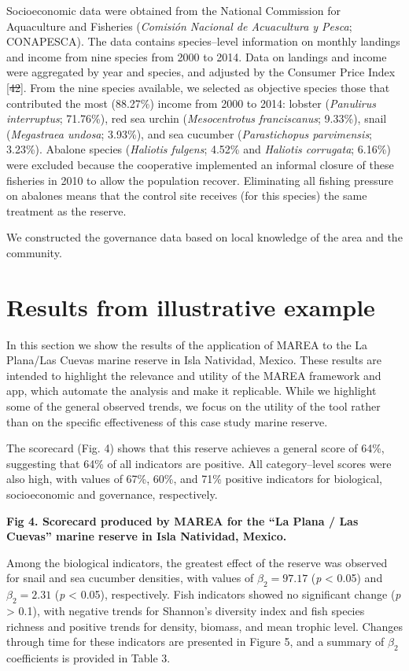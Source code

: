 \documentclass[12pt,]{article}
\providecommand{\DIFaddtex}[1]{{\protect\color{blue}\uwave{#1}}} %
\providecommand{\DIFdeltex}[1]{{\protect\color{red}\sout{#1}}}                      %
\providecommand{\DIFaddbegin}{} %
\providecommand{\DIFaddend}{} %
\providecommand{\DIFdelbegin}{} %
\providecommand{\DIFdelend}{} %
\providecommand{\DIFadd}[1]{\texorpdfstring{\DIFaddtex{#1}}{#1}} %
\providecommand{\DIFdel}[1]{\texorpdfstring{\DIFdeltex{#1}}{}} %
\newcommand{\DIFscaledelfig}{0.5}
\newlength{\DIFdelgraphicswidth} %
\newlength{\DIFdelgraphicsheight} %
\newcommand{\DIFaddincludegraphics}[2][]{{\color{blue}\fbox{\DIFOincludegraphics[#1]{#2}}}} %
\newcommand{\DIFdelincludegraphics}[2][]{%
\sbox{\DIFdelgraphicsbox}{\DIFOincludegraphics[#1]{#2}}%
\settoboxwidth{\DIFdelgraphicswidth}{\DIFdelgraphicsbox} %
\settoboxtotalheight{\DIFdelgraphicsheight}{\DIFdelgraphicsbox} %
\scalebox{\DIFscaledelfig}{%
\parbox[b]{\DIFdelgraphicswidth}{\usebox{\DIFdelgraphicsbox}\\[-\baselineskip] \rule{\DIFdelgraphicswidth}{0em}}\llap{\resizebox{\DIFdelgraphicswidth}{\DIFdelgraphicsheight}{%
\setlength{\unitlength}{\DIFdelgraphicswidth}%
\begin{picture}(1,1)%
\thicklines\linethickness{2pt} %
{\color[rgb]{1,0,0}\put(0,0){\framebox(1,1){}}}%
{\color[rgb]{1,0,0}\put(0,0){\line( 1,1){1}}}%
{\color[rgb]{1,0,0}\put(0,1){\line(1,-1){1}}}%
\end{picture}%
}\hspace*{3pt}}} %
} %
\DeclareRobustCommand{\DIFaddbegin}{\DIFOaddbegin \let\includegraphics\DIFaddincludegraphics} %
\DeclareRobustCommand{\DIFaddend}{\DIFOaddend \let\includegraphics\DIFOincludegraphics} %
\DeclareRobustCommand{\DIFdelbegin}{\DIFOdelbegin \let\includegraphics\DIFdelincludegraphics} %
\DeclareRobustCommand{\DIFdelend}{\DIFOaddend \let\includegraphics\DIFOincludegraphics} %
\begin{document}
Socioeconomic data were obtained from the National Commission for
Aquaculture and Fisheries (\emph{Comisión Nacional de Acuacultura y
Pesca}; CONAPESCA). The data contains species--level information on
monthly landings and income from nine species from 2000 to 2014. Data on
landings and income were aggregated by year and species, and adjusted by
the Consumer Price Index {[}\DIFdelbegin \DIFdel{42}\DIFdelend \DIFaddbegin \DIFadd{47}\DIFaddend {]}. From the nine species available, we
selected as objective species those that contributed the most (88.27\%)
income from 2000 to 2014: lobster (\emph{Panulirus interruptus};
71.76\%), red sea urchin (\emph{Mesocentrotus franciscanus}; 9.33\%),
snail (\emph{Megastraea undosa}; 3.93\%), and sea cucumber
(\emph{Parastichopus parvimensis}; 3.23\%). Abalone species
(\emph{Haliotis fulgens}; 4.52\% and \emph{Haliotis corrugata}; 6.16\%)
were excluded because the cooperative implemented an informal closure of
these fisheries in 2010 to allow the population recover. Eliminating all
fishing pressure on abalones means that the control site receives (for
this species) the same treatment as the reserve.

We constructed the governance data based on local knowledge of the area
and the community.

\section{Results from illustrative
example}\label{results-from-illustrative-example}

In this section we show the results of the application of MAREA to the
La Plana/Las Cuevas marine reserve in Isla Natividad, Mexico. These
results are intended to highlight the relevance and utility of the MAREA
framework and app, which automate the analysis and make it replicable.
While we highlight some of the general observed trends, we focus on the
utility of the tool rather than on the specific effectiveness of this
case study marine reserve.

The scorecard (Fig. 4) shows that this reserve achieves a general score
of 64\%, suggesting that 64\% of all indicators are positive. All
category--level scores were also high, with values of 67\%, 60\%, and
71\% positive indicators for biological, socioeconomic and governance,
respectively.

\textbf{Fig 4. Scorecard produced by MAREA for the ``La Plana / Las
Cuevas'' marine reserve in Isla Natividad, Mexico.}

Among the biological indicators, the greatest effect of the reserve was
observed for snail and sea cucumber densities, with values of
\(\beta_2 = 97.17\) (\emph{p} \textless{} 0.05) and \(\beta_2 = 2.31\)
(\emph{p} \textless{} 0.05), respectively. Fish indicators showed no
significant change (\emph{p} \textgreater{} 0.1), with negative trends
for Shannon's diversity index and fish species richness and positive
trends for density, biomass, and mean trophic level. Changes through
time for these indicators are presented in Figure 5, and a summary of
\(\beta_2\) coefficients is provided in Table 3.
\end{document}

